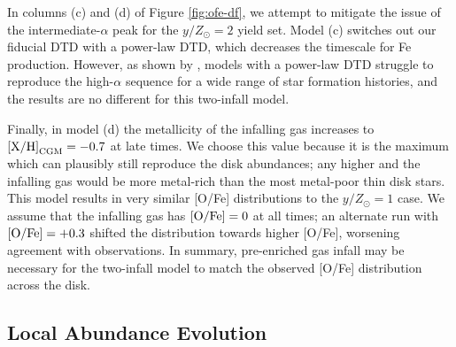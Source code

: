 \documentclass[twocolumn,twocolappendix,linenumbers]{aastex631}
\newcommand{\mathXH}{{\rm [X/H]}}
\newcommand{\mathOFe}{{\rm [O/Fe]}}
\begin{document}
In columns (c) and (d) of Figure \ref{fig:ofe-df}, we attempt to mitigate the issue of the intermediate-$\alpha$ peak for the $y/Z_\odot=2$ yield set. Model (c) switches out our fiducial DTD with a power-law DTD, which decreases the timescale for Fe production. However, as shown by \citet{dubay_galactic_2024}, models with a power-law DTD struggle to reproduce the high-$\alpha$ sequence for a wide range of star formation histories, and the results are no different for this two-infall model. 

Finally, in model (d) the metallicity of the infalling gas increases to $\mathXH_{\rm CGM}=-0.7$ at late times. We choose this value because it is the maximum which can plausibly still reproduce the disk abundances; any higher and the infalling gas would be more metal-rich than the most metal-poor thin disk stars. This model results in very similar [O/Fe] distributions to the $y/Z_\odot=1$ case. We assume that the infalling gas has $\mathOFe=0$ at all times; an alternate run with $\mathOFe=+0.3$ shifted the distribution towards higher [O/Fe], worsening agreement with observations. In summary, pre-enriched gas infall may be necessary for the two-infall model to match the observed [O/Fe] distribution across the disk.

\subsection{Local Abundance Evolution}
\label{sec:age-abundance}
\end{document}
